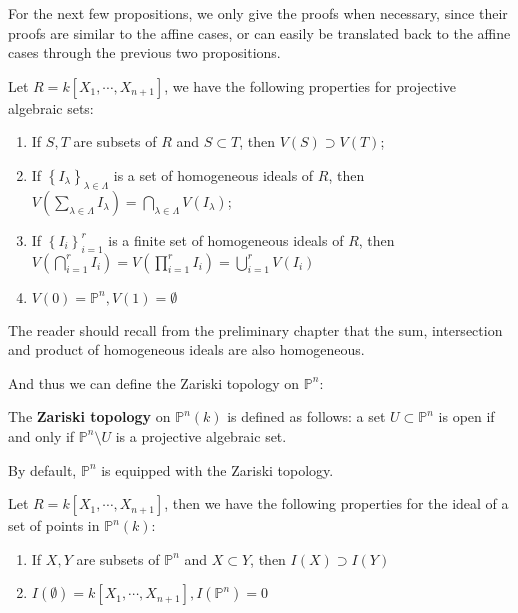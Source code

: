 \documentclass{note-eng}
\begin{document}
For the next few propositions, we only give the proofs when necessary, since their proofs are similar to the affine cases, or can easily be translated back to the affine cases through the previous two propositions.

\begin{proposition}
    Let $R = k[X_1, \cdots, X_{n + 1}]$, we have the following properties for projective algebraic sets:
    \begin{enumerate}
        \item If $S, T$ are subsets of $R$ and $S \subset T$, then $V(S) \supset V(T)$;
        \item If $\left\lbrace I_\lambda \right\rbrace_{\lambda \in \Lambda}$ is a set of homogeneous ideals of $R$, then $V\left(\sum\limits_{\lambda \in \Lambda} I_\lambda\right) = \bigcap\limits_{\lambda \in \Lambda} V(I_\lambda)$;
        \item If $\left\lbrace I_i \right\rbrace_{i = 1}^r$ is a finite set of homogeneous ideals of $R$, then $V \left(\bigcap\limits_{i = 1}^{r} I_i\right) = V \left(\prod\limits_{i = 1}^{r} I_i\right) = \bigcup\limits_{i = 1}^{r} V(I_i)$
        \item $V(0) = \mathbb{P}^n, V(1) = \emptyset$
    \end{enumerate}
\end{proposition}

\begin{remark}
    The reader should recall from the preliminary chapter that the sum, intersection and product of homogeneous ideals are also homogeneous.
\end{remark}

And thus we can define the Zariski topology on $\mathbb{P}^n$:

\begin{definition}
    The \textbf{Zariski topology} on $\mathbb{P}^n(k)$ is defined as follows: a set $U \subset \mathbb{P}^n$ is open if and only if $\mathbb{P}^n \setminus U$ is a projective algebraic set.
\end{definition}

By default, $\mathbb{P}^n$ is equipped with the Zariski topology.

\begin{proposition}
    Let $R = k[X_1, \cdots, X_{n + 1}]$, then we have the following properties for the ideal of a set of points in $\mathbb{P}^n(k)$:
    \begin{enumerate}
        \item If $X, Y$ are subsets of $\mathbb{P}^n$ and $X \subset Y$, then $I(X) \supset I(Y)$
        \item $I(\emptyset) = k[X_1, \cdots, X_{n + 1}], I(\mathbb{P}^n) = 0$
    \end{enumerate}
\end{proposition}
\end{document}

